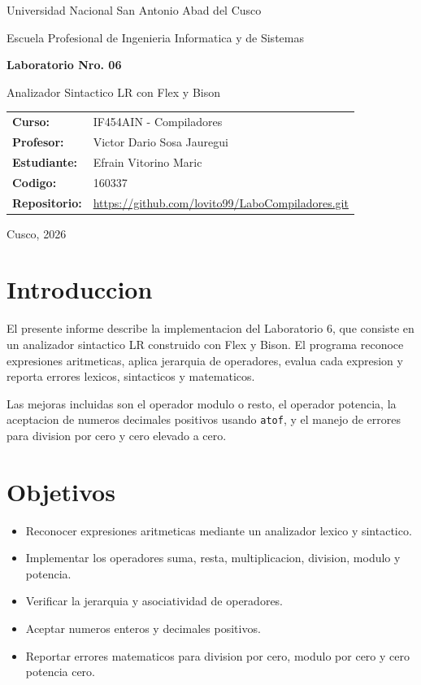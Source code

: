 \documentclass[12pt,a4paper]{article}
\begin{document}
\begin{titlepage}
    \centering
    {\Large Universidad Nacional San Antonio Abad del Cusco\par}
    \vspace{0.3cm}
    {\large Escuela Profesional de Ingenieria Informatica y de Sistemas\par}
    \vspace{1.5cm}
    {\Huge\bfseries Laboratorio Nro. 06\par}
    \vspace{0.4cm}
    {\Large Analizador Sintactico LR con Flex y Bison\par}
    \vspace{1.5cm}
    \begin{tabular}{>{\bfseries}ll}
        Curso: & IF454AIN - Compiladores \\
        Profesor: & Victor Dario Sosa Jauregui \\
        Estudiante: & Efrain Vitorino Maric \\
        Codigo: & 160337 \\
        Repositorio: & \url{https://github.com/lovito99/LaboCompiladores.git} \\
    \end{tabular}
    \vfill
    {\large Cusco, 2026\par}
\end{titlepage}

\tableofcontents
\newpage

\section{Introduccion}

El presente informe describe la implementacion del Laboratorio 6, que consiste en un analizador sintactico LR construido con Flex y Bison. El programa reconoce expresiones aritmeticas, aplica jerarquia de operadores, evalua cada expresion y reporta errores lexicos, sintacticos y matematicos.

Las mejoras incluidas son el operador modulo o resto, el operador potencia, la aceptacion de numeros decimales positivos usando \texttt{atof}, y el manejo de errores para division por cero y cero elevado a cero.

\section{Objetivos}

\begin{itemize}
    \item Reconocer expresiones aritmeticas mediante un analizador lexico y sintactico.
    \item Implementar los operadores suma, resta, multiplicacion, division, modulo y potencia.
    \item Verificar la jerarquia y asociatividad de operadores.
    \item Aceptar numeros enteros y decimales positivos.
    \item Reportar errores matematicos para division por cero, modulo por cero y cero potencia cero.
\end{itemize}
\end{document}
